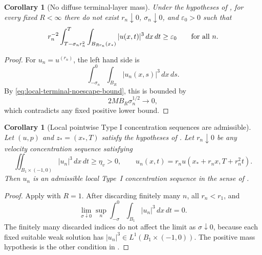 \documentclass[11pt]{amsart}
\numberwithin{equation}{section}
\theoremstyle{plain}
\newtheorem{corollary}[theorem]{Corollary}
\theoremstyle{definition}
\theoremstyle{remark}
\begin{document}
\begin{corollary}[No diffuse terminal-layer mass]
\label{cor:no-diffuse-terminal-layer-mass}
Under the hypotheses of , for
every fixed \(R<\infty\) there do not exist \(r_n\downarrow0\),
\(\sigma_n\downarrow0\), and \(\varepsilon_0>0\) such that
\[
  r_n^{-2}
  \int_{T-\sigma_n r_n^2}^{T}
  \int_{B_{Rr_n}(x_*)}|u(x,t)|^3\,dx\,dt
  \ge \varepsilon_0
  \qquad\hbox{for all }n .
\]
\end{corollary}

\begin{proof}
For \(u_n=u^{(r_n)}\), the left hand side is
\[
   \int_{-\sigma_n}^{0}\int_{B_R}|u_n(x,s)|^3\,dx\,ds .
\]
By \eqref{eq:local-terminal-noescape-bound}, this is bounded by
\[
   2MB_R\sigma_n^{1/2}\to0,
\]
which contradicts any fixed positive lower bound.
\end{proof}

\begin{corollary}[Local pointwise Type I concentration sequences are admissible]
\label{cor:local-typeI-implies-admissible}
Let \((u,p)\) and \(z_*=(x_*,T)\) satisfy the hypotheses of
.  Let \(r_n\downarrow0\) be any
velocity concentration sequence satisfying
\[
   \iint_{B_1\times(-1,0)} |u_n|^3\,dx\,dt\ge\eta_v>0,
   \qquad
   u_n(x,t)=r_nu(x_*+r_nx,T+r_n^2t).
\]
Then \(u_n\) is an admissible local Type~I concentration sequence in the sense
of .
\end{corollary}

\begin{proof}
Apply  with \(R=1\).  After
discarding finitely many \(n\), all \(r_n<r_1\), and
\[
   \lim_{\sigma\downarrow0}
   \sup_n
   \int_{-\sigma}^{0}\int_{B_1}|u_n|^3\,dx\,dt=0 .
\]
The finitely many discarded indices do not affect the limit as
\(\sigma\downarrow0\), because each fixed suitable weak solution has
\(|u_n|^3\in L^1(B_1\times(-1,0))\).  The positive mass hypothesis is the other
condition in .
\end{proof}
\end{document}
